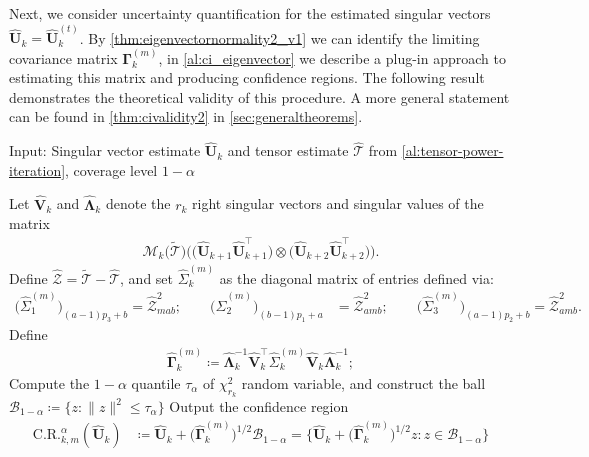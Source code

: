 \documentclass[10pt]{article}
\newcommand{\0}{{\mathbf{0}}}
\newcommand{\1}{{\mathbf{1}}}
\newcommand{\U}{{\mathbf{U}}}
\renewcommand{\t}{^{\top}}
\newcommand{\uhat}{\mathbf{\hat{U}}}
\newcommand{\inv}{^{-1}}
\renewcommand{\tilde}{\widetilde}
\renewcommand{\hat}{\widehat}
\renewcommand{\hat}{\widehat}
\begin{document}
  Next, we consider uncertainty quantification for the estimated singular vectors $\uhat_k = \uhat_k^{(t)}$. By \cref{thm:eigenvectornormality2_v1} we can identify the limiting covariance matrix $\mathbf{\Gamma}_k^{(m)}$, in \cref{al:ci_eigenvector} we describe a plug-in approach to estimating this matrix and producing confidence regions.  The following result demonstrates the theoretical  validity of this procedure.  A more general statement can be found in \cref{thm:civalidity2} in \cref{sec:generaltheorems}.  

  \begin{algorithm}[t]
	\caption{Confidence Regions for $(\U_k)_{m\cdot}$}
	\begin{algorithmic}[1]
		\State Input:  Singular vector estimate $\uhat_k$ and tensor estimate $\mathcal{\hat T}$ from \cref{al:tensor-power-iteration}, coverage level $1 - \alpha$  
		
			\State Let $\mathbf{\hat V}_k$ and $\mathbf{\hat \Lambda}_k$ denote the $r_k$ right singular vectors and singular values of the matrix
		\begin{align*}
		    \mathcal{M}_k\big(  \mathcal{\tilde T} \big) \bigg( \big(\uhat_{k+1} \uhat_{k+1}\t \big) \otimes \big(\uhat_{k+2} \uhat_{k+2}\t \big) \bigg).
		\end{align*}
	\State Define $\mathcal{\hat Z} = \mathcal{\tilde T} - \mathcal{\hat T}$, and set $\hat \Sigma^{(m)}_k$ as the diagonal matrix of entries defined via:
		\begin{align*}
		    \bigg(\hat \Sigma^{(m)}_1 \bigg)_{(a-1)p_3 + b} = 		    \mathcal{\hat Z}^2_{mab};\qquad
		     \bigg(\hat \Sigma^{(m)}_2 \bigg)_{(b-1)p_1 + a} &= 		    \mathcal{\hat Z}^2_{amb}; \qquad 
		        \bigg(\hat \Sigma^{(m)}_3 \bigg)_{(a-1)p_2 + b} = 		    \mathcal{\hat Z}^2_{amb}.
		\end{align*}
		\State Define
		\begin{align*}
		    \mathbf{\hat \Gamma}_k^{(m)} \coloneqq \mathbf{\hat \Lambda}_k\inv \mathbf{\hat V}_k\t \hat \Sigma^{(m)}_k \mathbf{\hat V}_k \mathbf{\hat \Lambda}_k\inv;
		\end{align*}
		\State Compute the $1 - \alpha$ quantile $\tau_{\alpha}$ of $\chi^2_{r_k}$ random variable, and construct the ball $\mathcal{B}_{1-\alpha} \coloneqq \{z: \|z\|^2 \leq \tau_{\alpha}\}$
		\State Output the confidence region
		\begin{align*}
		   \mathrm{C.R.}_{k,m}^{\alpha}(\uhat_k) &\coloneqq \uhat_k + \big(  \mathbf{\hat \Gamma}_k^{(m)}  \big)^{1/2} \mathcal{B}_{1-\alpha} = \{ \uhat_k + \big(  \mathbf{\hat \Gamma}_k^{(m)}  \big)^{1/2} z: z \in  \mathcal{B}_{1-\alpha} \}
		\end{align*}
		\end{algorithmic}\label{al:ci_eigenvector}
\end{algorithm}
  
\end{document}
